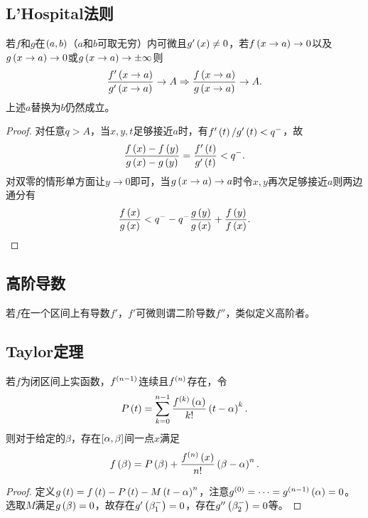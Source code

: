 \documentclass{ctexrep}
\begin{document}
  \subsection{L'Hospital法则}
  \begin{theorem}
    若$f$和$g$在$\left(a,b\right)$（$a$和$b$可取无穷）内可微且$g'\left(x\right)\neq 0$，若$f\left(x\rightarrow a\right)\rightarrow 0$以及$g\left(x\rightarrow a\right)\rightarrow 0$或$g\left(x\rightarrow a\right)\rightarrow \pm\infty$则
    \[ \frac{f'\left(x\rightarrow a\right)}{g'\left(x\rightarrow a\right)}\rightarrow A \Rightarrow \frac{f\left(x\rightarrow a\right)}{g\left(x\rightarrow a\right)} \rightarrow A. \]
    上述$a$替换为$b$仍然成立。
  \end{theorem}
  \begin{proof}
    对任意$q>A$，当$x,y,t$足够接近$a$时，有$f'\left(t\right)/g'\left(t\right)<q^-$，故
    \[ \frac{f\left(x\right)-f\left(y\right)}{g\left(x\right)-g\left(y\right)} = \frac{f'\left(t\right)}{g'\left(t\right)} < q^-. \]
    对双零的情形单方面让$y\rightarrow0$即可，当$g\left(x\rightarrow a\right)\rightarrow a$时令$x,y$再次足够接近$a$则两边通分有
    \[ \frac{f\left(x\right)}{g\left(x\right)} < q^- - q^- \frac{g\left(y\right)}{g\left(x\right)}+\frac{f\left(y\right)}{f\left(x\right)}. \]
  \end{proof}
  \subsection{高阶导数}
  \begin{definition}
    若$f$在一个区间上有导数$f'$，$f'$可微则谓二阶导数$f''$，类似定义高阶者。
  \end{definition}
  \subsection{Taylor定理}
  \begin{theorem}
    若$f$为闭区间上实函数，$f^{\left(n-1\right)}$连续且$f^{\left(n\right)}$存在，令
    \[ P\left(t\right) = \sum_{k=0}^{n-1} \frac{f^{\left(k\right)}\left(\alpha\right)}{k!}\left(t-\alpha\right)^k. \]
    则对于给定的$\beta$，存在$\left[\alpha, \beta\right]$间一点$x$满足
    \[ f\left(\beta\right) = P\left(\beta\right) + \frac{f^{\left(n\right)}\left(x\right)}{n!}\left(\beta-\alpha\right)^n. \]
  \end{theorem}
  \begin{proof}
    定义$g\left(t\right) = f\left(t\right) - P\left(t\right) - M\left(t-\alpha\right)^n$，注意$g^{\left(0\right)}=\cdots=g^{\left(n-1\right)}\left(\alpha\right)=0$。选取$M$满足$g\left(\beta\right)=0$，故存在$g'\left(\beta^-_1\right)=0$，存在$g''\left(\beta^-_2\right)=0$等。
  \end{proof}
\end{document}
